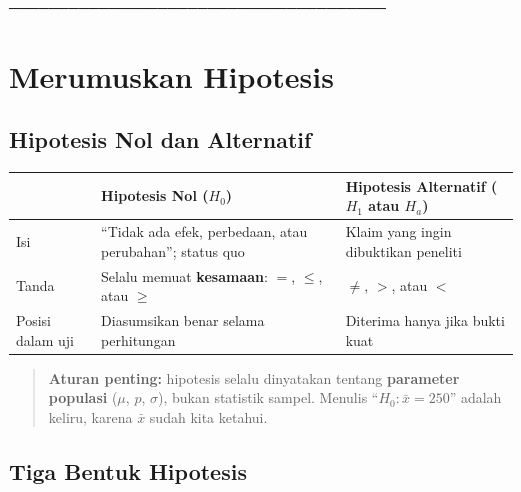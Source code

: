\documentclass[
  indonesian,
  letterpaper,
]{book}
\newcounter{none} %
\begin{document}
──────────────────────────────────────

\section{Merumuskan Hipotesis}\label{merumuskan-hipotesis}

\subsection{Hipotesis Nol dan
Alternatif}\label{hipotesis-nol-dan-alternatif}

{\def\LTcaptype{none} %
\begin{longtable}[]{@{}
  >{\raggedright\arraybackslash}p{}
  >{\raggedright\arraybackslash}p{}
  >{\raggedright\arraybackslash}p{}@{}}
\toprule\noalign{}
\begin{minipage}[b]{\linewidth}\raggedright
\end{minipage} & \begin{minipage}[b]{\linewidth}\raggedright
Hipotesis Nol (\(H_0\))
\end{minipage} & \begin{minipage}[b]{\linewidth}\raggedright
Hipotesis Alternatif (\(H_1\) atau \(H_a\))
\end{minipage} \\
\midrule\noalign{}
\endhead
\bottomrule\noalign{}
\endlastfoot
Isi & ``Tidak ada efek, perbedaan, atau perubahan''; status quo & Klaim
yang ingin dibuktikan peneliti \\
Tanda & Selalu memuat \textbf{kesamaan}: \(=\), \(\le\), atau \(\ge\) &
\(\ne\), \(>\), atau \(<\) \\
Posisi dalam uji & Diasumsikan benar selama perhitungan & Diterima hanya
jika bukti kuat \\
\end{longtable}
}

\begin{quote}
\textbf{Aturan penting:} hipotesis selalu dinyatakan tentang
\textbf{parameter populasi} (\(\mu\), \(p\), \(\sigma\)), bukan
statistik sampel. Menulis ``\(H_0: \bar{x} = 250\)'' adalah keliru,
karena \(\bar{x}\) sudah kita ketahui.
\end{quote}

\subsection{Tiga Bentuk Hipotesis}\label{tiga-bentuk-hipotesis}
\end{document}

